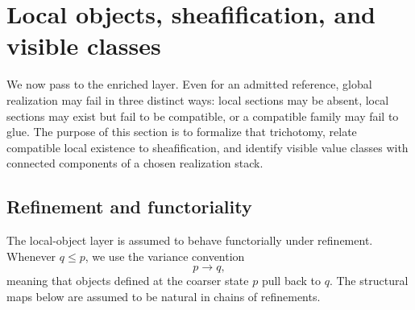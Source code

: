 \section{Local objects, sheafification, and visible classes}\label{sec:null-decomposition}

We now pass to the enriched layer. Even for an admitted reference, global realization may fail in three distinct ways: local sections may be absent, local sections may exist but fail to be compatible, or a compatible family may fail to glue. The purpose of this section is to formalize that trichotomy, relate compatible local existence to sheafification, and identify visible value classes with connected components of a chosen realization stack.

\subsection{Refinement and functoriality}\label{sec:refinement-axioms}

The local-object layer is assumed to behave functorially under refinement. Whenever $q\le p$, we use the variance convention
\[
p\longrightarrow q,
\]
meaning that objects defined at the coarser state $p$ pull back to $q$. The structural maps below are assumed to be natural in chains of refinements.

